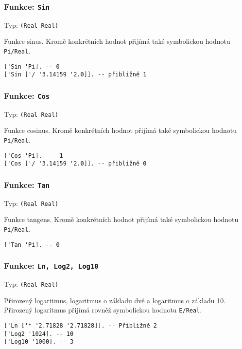 \subsubsection*{Funkce: \lstinline{Sin}}
Typ: \lstinline{(Real Real)}

Funkce sinus. Kromě konkrétních hodnot přijímá také symbolickou hodnotu \lstinline{Pi/Real}.

\begin{lstlisting}[caption={Ukázka využití Sin}]
['Sin 'Pi]. -- 0
['Sin ['/ '3.14159 '2.0]]. -- přibližně 1
\end{lstlisting}

\subsubsection*{Funkce: \lstinline{Cos}}
Typ: \lstinline{(Real Real)}

Funkce cosinus. Kromě konkrétních hodnot přijímá také symbolickou hodnotu \lstinline{Pi/Real}.

\begin{lstlisting}[caption={Ukázka využití Cos}]
['Cos 'Pi]. -- -1
['Cos ['/ '3.14159 '2.0]]. -- přibližně 0
\end{lstlisting}

\subsubsection*{Funkce: \lstinline{Tan}}
Typ: \lstinline{(Real Real)}

Funkce tangens. Kromě konkrétních hodnot přijímá také symbolickou hodnotu \lstinline{Pi/Real}.

\begin{lstlisting}[caption={Ukázka využití Tan}]
['Tan 'Pi]. -- 0
\end{lstlisting}

\subsubsection*{Funkce: \lstinline{Ln, Log2, Log10}}
Typ: \lstinline{(Real Real)}

Přirozený logaritmus, logaritmus o základu dvě a logaritmus o základu 10. Přirozený logaritmus
přijímá rovněž symbolickou hodnotu \lstinline{E/Real}.

\begin{lstlisting}[caption={Ukázka využití Ln, Log2, Log10}]
['Ln ['* '2.71828 '2.71828]]. -- Přibližně 2
['Log2 '1024]. -- 10
['Log10 '1000]. -- 3
\end{lstlisting}

